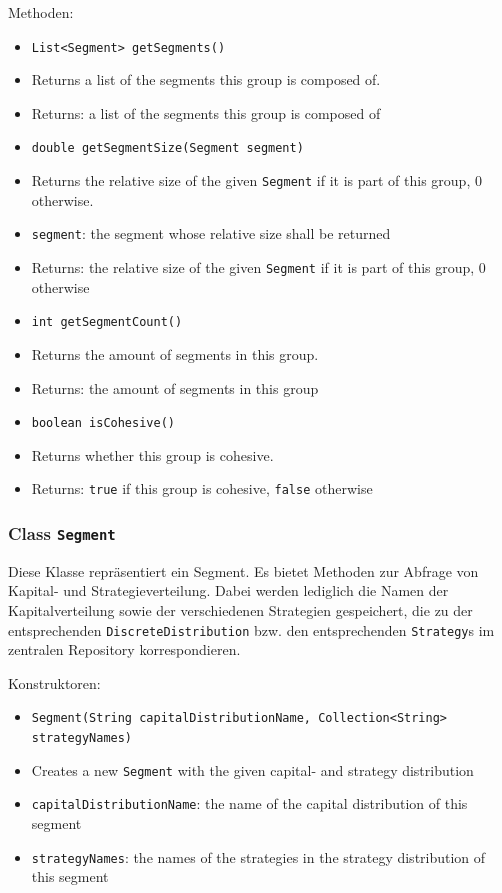 \documentclass[parskip=full,11pt]{scrartcl}
\begin{document}
Methoden:
\begin{itemize}\itemsep -10pt
\item \texttt{List<Segment> getSegments()}
\item[] Returns a list of the segments this group is composed of.
\item[] Returns: a list of the segments this group is composed of

\item \texttt{double getSegmentSize(Segment segment)}
\item[] Returns the relative size of the given \texttt{Segment} if it is part of this group, \(0\) otherwise.
\item[] \texttt{segment}: the segment whose relative size shall be returned
\item[] Returns: the relative size of the given \texttt{Segment} if it is part of this group, \(0\) otherwise

\item \texttt{int getSegmentCount()}
\item[] Returns the amount of segments in this group.
\item[] Returns: the amount of segments in this group

\item \texttt{boolean isCohesive()}
\item[] Returns whether this group is cohesive.
\item[] Returns: \texttt{true} if this group is cohesive, \texttt{false} otherwise
\end{itemize}

\subsubsection{Class \texttt{Segment}}

Diese Klasse repräsentiert ein Segment. Es bietet Methoden zur Abfrage von Kapital- und Strategieverteilung. Dabei werden lediglich die Namen der Kapitalverteilung sowie der verschiedenen Strategien gespeichert, die zu der entsprechenden \texttt{DiscreteDistribution} bzw. den entsprechenden \texttt{Strategy}s im zentralen Repository korrespondieren.

Konstruktoren:
\begin{itemize}\itemsep -10pt
\item \texttt{Segment(String capitalDistributionName, Collection<String> strategyNames)}
\item[] Creates a new \texttt{Segment} with the given capital- and strategy distribution
\item[] \texttt{capitalDistributionName}: the name of the capital distribution of this segment
\item[] \texttt{strategyNames}: the names of the strategies in the strategy distribution of this segment
\end{itemize}
\end{document}
